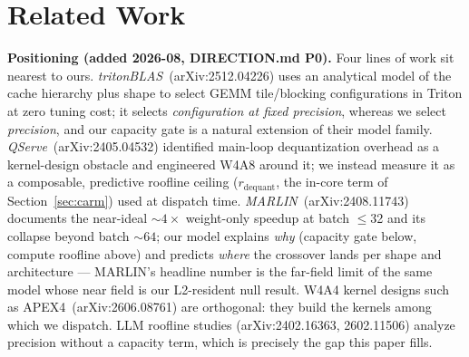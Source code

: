 \documentclass[10pt,twocolumn]{article}
\begin{document}
\section{Related Work}

\textbf{Positioning (added 2026-08, DIRECTION.md P0).}  Four lines of work sit nearest to ours.  \emph{tritonBLAS}~(arXiv:2512.04226) uses an analytical model of the cache hierarchy plus shape to select GEMM tile/blocking configurations in Triton at zero tuning cost; it selects \emph{configuration at fixed precision}, whereas we select \emph{precision}, and our capacity gate is a natural extension of their model family.  \emph{QServe}~(arXiv:2405.04532) identified main-loop dequantization overhead as a kernel-design obstacle and engineered W4A8 around it; we instead measure it as a composable, predictive roofline ceiling ($r_\text{dequant}$, the in-core term of Section~\ref{sec:carm}) used at dispatch time.  \emph{MARLIN}~(arXiv:2408.11743) documents the near-ideal ${\sim}4\times$ weight-only speedup at batch $\leq$32 and its collapse beyond batch ${\sim}64$; our model explains \emph{why} (capacity gate below, compute roofline above) and predicts \emph{where} the crossover lands per shape and architecture --- MARLIN's headline number is the far-field limit of the same model whose near field is our L2-resident null result.  W4A4 kernel designs such as APEX4~(arXiv:2606.08761) are orthogonal: they build the kernels among which we dispatch.  LLM roofline studies (arXiv:2402.16363, 2602.11506) analyze precision without a capacity term, which is precisely the gap this paper fills.
\end{document}
